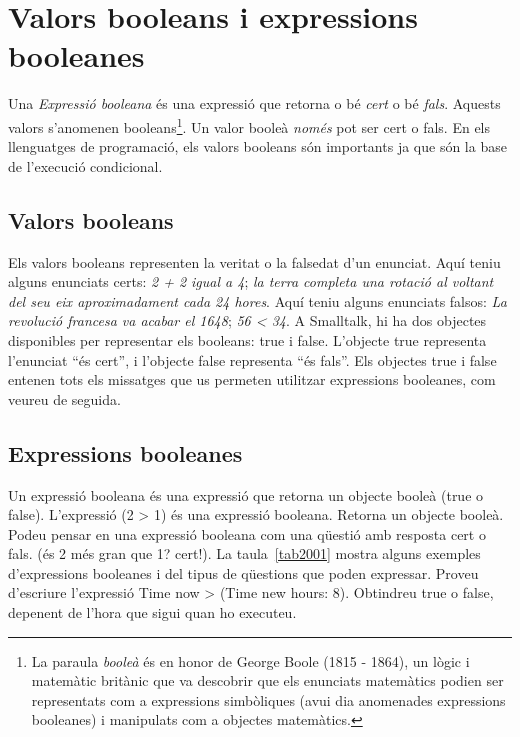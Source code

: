 \section{Valors booleans i expressions booleanes}
Una \emph{Expressió booleana} és una expressió que retorna o bé \emph{cert} o bé \emph{fals}. Aquests valors s'anomenen booleans\footnote{La paraula \emph{booleà} és en honor de George Boole (1815 - 1864), un lògic i matemàtic britànic que va descobrir que els enunciats matemàtics podien ser representats com a expressions simbòliques (avui dia anomenades expressions booleanes) i  manipulats com a objectes matemàtics.}. Un valor booleà \emph{només} pot ser cert o fals. En els llenguatges de programació, els valors booleans són importants ja que són la base de l'execució condicional.

\subsection{Valors booleans}
Els valors booleans representen la veritat o la falsedat d'un enunciat. Aquí teniu alguns enunciats certs: \emph{2 + 2 igual a 4}; \emph{la terra completa una rotació al voltant del seu eix aproximadament cada 24 hores}. Aquí teniu alguns enunciats falsos: \emph{La revolució francesa va acabar el 1648}; \emph{56 \textless \hspace*{1mm} 34}. A Smalltalk, hi ha dos objectes disponibles per representar els booleans: \textsf{true} i \textsf{false}. L'objecte \textsf{true} representa l'enunciat ``és cert'', i l'objecte \textsf{false} representa ``és fals''. Els objectes \textsf{true} i \textsf{false} entenen tots els missatges que us permeten utilitzar expressions booleanes, com veureu de seguida.

\subsection{Expressions booleanes}
Un expressió booleana és una expressió que retorna un objecte booleà (\textsf{true} o \textsf{false}). L'expressió \textsf{(2 \textgreater \hspace*{1mm} 1)} és una expressió booleana. Retorna un objecte booleà. Podeu pensar en una expressió booleana com una qüestió amb resposta cert o fals. (és 2 més gran que 1? cert!). La taula~\ref{tab2001} mostra alguns exemples d'expressions booleanes i del tipus de qüestions que poden expressar. Proveu d'escriure l'expressió \textsf{Time now \textgreater \hspace*{1mm} (Time new hours: 8)}. Obtindreu \textsf{true} o \textsf{false}, depenent de l'hora que sigui quan ho executeu.

